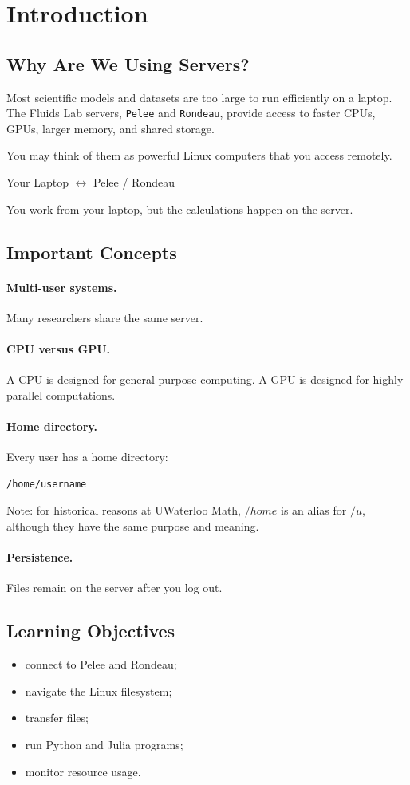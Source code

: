 \section{Introduction}

\subsection{Why Are We Using Servers?}

Most scientific models and datasets are too large to run efficiently on a laptop.
The Fluids Lab servers, \texttt{Pelee} and \texttt{Rondeau}, provide access to faster CPUs, GPUs, larger memory, and shared storage.

You may think of them as powerful Linux computers that you access remotely.

\begin{center}
Your Laptop $\longleftrightarrow$ Pelee / Rondeau
\end{center}

You work from your laptop, but the calculations happen on the server.

\subsection{Important Concepts}

\paragraph{Multi-user systems.}
Many researchers share the same server.

\paragraph{CPU versus GPU.}
A CPU is designed for general-purpose computing. A GPU is designed for highly parallel computations.

\paragraph{Home directory.}
Every user has a home directory:

\begin{lstlisting}
/home/username
\end{lstlisting}
Note: for historical reasons at UWaterloo Math, $/home$ is an alias for $/u$, although they have the same purpose and meaning.

\paragraph{Persistence.}
Files remain on the server after you log out.

\subsection{Learning Objectives}

\begin{itemize}
\item connect to Pelee and Rondeau;
\item navigate the Linux filesystem;
\item transfer files;
\item run Python and Julia programs;
\item monitor resource usage.
\end{itemize}

